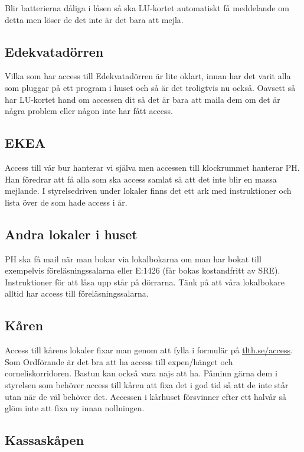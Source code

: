 \documentclass[10pt]{article}
\begin{document}
    Blir batterierna dåliga i låsen så ska LU-kortet automatiskt få meddelande om detta men löser de det inte är det bara att mejla.
    
    \subsection{Edekvatadörren}
    
    Vilka som har access till Edekvatadörren är lite oklart, innan har det varit alla som pluggar på ett program i huset och så är det troligtvis nu också. Oavsett så har LU-kortet hand om accessen dit så det är bara att maila dem om det är några problem eller någon inte har fått access.
    
    \subsection{EKEA}
    
    Access till vår bur hanterar vi själva men accessen till klockrummet hanterar PH. Han föredrar att få alla som ska access samlat så att det inte blir en massa mejlande. I styrelsedriven under lokaler finns det ett ark med instruktioner och lista över de som hade access i år. 
    
    \subsection{Andra lokaler i huset}
    
    PH ska få mail när man bokar via lokalbokarna om man har bokat till exempelvis föreläsningssalarna eller E:1426 (får bokas kostandfritt av SRE). Instruktioner för att låsa upp står på dörrarna. Tänk på att våra lokalbokare alltid har access till föreläsningssalarna.
    
    \subsection{Kåren}
    
    Access till kårens lokaler fixar man genom att fylla i formulär på \url{tlth.se/access}. Som Ordförande är det bra att ha access till expen/hänget och corneliskorridoren. Bastun kan också vara najs att ha. Påminn gärna dem i styrelsen som behöver access till kåren att fixa det i god tid så att de inte står utan när de väl behöver det. Accessen i kårhuset försvinner efter ett halvår så glöm inte att fixa ny innan nollningen.
    
    \subsection{Kassaskåpen}
    
\end{document}
